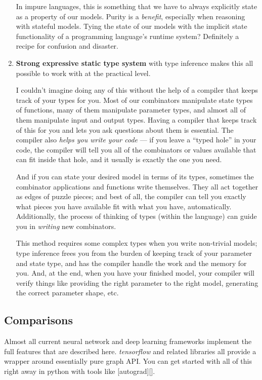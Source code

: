 \documentclass[]{article}
\begin{document}
\begin{enumerate}
  In impure languages, this is something that we have to always explicitly state
  as a property of our models. Purity is a \emph{benefit}, especially when
  reasoning with stateful models. Tying the state of our models with the
  implicit state functionality of a programming language's runtime system?
  Definitely a recipe for confusion and disaster.
\item
  \textbf{Strong expressive static type system} with type inference makes this
  all possible to work with at the practical level.

  I couldn't imagine doing any of this without the help of a compiler that keeps
  track of your types for you. Most of our combinators manipulate state types of
  functions, many of them manipulate parameter types, and almost all of them
  manipulate input and output types. Having a compiler that keeps track of this
  for you and lets you ask questions about them is essential. The compiler also
  \emph{helps you write your code} --- if you leave a ``typed hole'' in your
  code, the compiler will tell you all of the combinators or values available
  that can fit inside that hole, and it usually is exactly the one you need.

  And if you can state your desired model in terms of its types, sometimes the
  combinator applications and functions write themselves. They all act together
  as edges of puzzle pieces; and best of all, the compiler can tell you exactly
  what pieces you have available fit with what you have, automatically.
  Additionally, the process of thinking of types (within the language) can guide
  you in \emph{writing} new combinators.

  This method requires some complex types when you write non-trivial models;
  type inference frees you from the burden of keeping track of your parameter
  and state type, and has the compiler handle the work and the memory for you.
  And, at the end, when you have your finished model, your compiler will verify
  things like providing the right parameter to the right model, generating the
  correct parameter shape, etc.
\end{enumerate}

\hypertarget{comparisons}{%
\subsection{Comparisons}\label{comparisons}}

Almost all current neural network and deep learning frameworks implement the
full features that are described here. \emph{tensorflow} and related libraries
all provide a wrapper around essentially pure graph API. You can get started
with all of this right away in python with tools like {[}autograd{]}{[}{]}.
\end{document}
